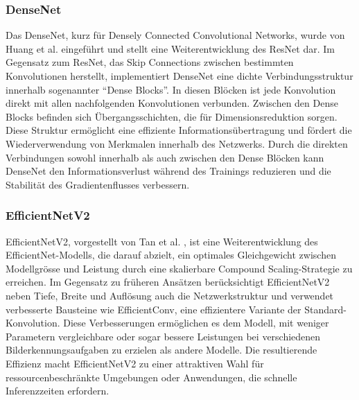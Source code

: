 \subsubsection{DenseNet}
Das DenseNet, kurz für Densely Connected Convolutional Networks, wurde von Huang et al. \cite{huang_densely_2018} eingeführt und stellt eine Weiterentwicklung des ResNet dar. Im Gegensatz zum ResNet, das Skip Connections zwischen bestimmten Konvolutionen herstellt, implementiert DenseNet eine dichte Verbindungsstruktur innerhalb sogenannter ``Dense Blocks''. In diesen Blöcken ist jede Konvolution direkt mit allen nachfolgenden Konvolutionen verbunden. Zwischen den Dense Blocks befinden sich Übergangsschichten, die für Dimensionsreduktion sorgen. Diese Struktur ermöglicht eine effiziente Informationsübertragung und fördert die Wiederverwendung von Merkmalen innerhalb des Netzwerks. Durch die direkten Verbindungen sowohl innerhalb als auch zwischen den Dense Blöcken kann DenseNet den Informationsverlust während des Trainings reduzieren und die Stabilität des Gradientenflusses verbessern.

\subsubsection{EfficientNetV2} 
EfficientNetV2, vorgestellt von Tan et al. \cite{tan_efficientnetv2_2021}, ist eine Weiterentwicklung des EfficientNet-Modells, die darauf abzielt, ein optimales Gleichgewicht zwischen Modellgrösse und Leistung durch eine skalierbare Compound Scaling-Strategie zu erreichen. Im Gegensatz zu früheren Ansätzen berücksichtigt EfficientNetV2 neben Tiefe, Breite und Auflösung auch die Netzwerkstruktur und verwendet verbesserte Bausteine wie EfficientConv, eine effizientere Variante der Standard-Konvolution. Diese Verbesserungen ermöglichen es dem Modell, mit weniger Parametern vergleichbare oder sogar bessere Leistungen bei verschiedenen Bilderkennungsaufgaben zu erzielen als andere Modelle. Die resultierende Effizienz macht EfficientNetV2 zu einer attraktiven Wahl für ressourcenbeschränkte Umgebungen oder Anwendungen, die schnelle Inferenzzeiten erfordern.
